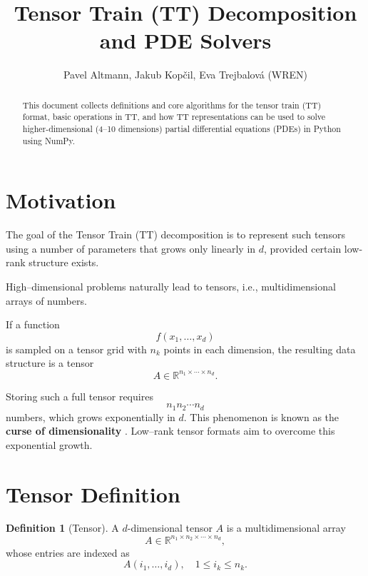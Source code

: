 \documentclass[11pt,a4paper,parskip=half-]{scrartcl}
\title{Tensor Train (TT) Decomposition and PDE Solvers}
\author{Pavel Altmann, Jakub Kopčil, Eva Trejbalová (WREN)}
\theoremstyle{definition}
\newtheorem{definition}{Definition}[section]
\theoremstyle{plain}
\theoremstyle{remark}
\begin{document}
\maketitle

\begin{abstract}
  This document collects definitions and core algorithms for the tensor train
  (TT) format, basic operations in TT, and how TT representations can be used to
  solve higher-dimensional (4--10 dimensions) partial differential equations
  (PDEs) in Python using NumPy.
\end{abstract}

\newpage
\tableofcontents
\newpage

\section{Motivation}

The goal of the Tensor Train (TT) decomposition is to represent
such tensors using a number of parameters that grows only
linearly in $d$, provided certain low-rank structure exists.

High–dimensional problems naturally lead to tensors, i.e.,
multidimensional arrays of numbers.

If a function
\[
  f(x_1,\dots,x_d)
\]
is sampled on a tensor grid with $n_k$ points in each dimension,
the resulting data structure is a tensor
\[
  A \in \mathbb{R}^{n_1 \times \cdots \times n_d}.
\]

Storing such a full tensor requires
\[
  n_1 n_2 \cdots n_d
\]
numbers, which grows exponentially in $d$. This phenomenon is known as the
\textbf{curse of dimensionality} \cite{Oseledets2009TreeTucker,Oseledets2011TT}.
Low–rank tensor formats aim to overcome this exponential growth.

\section{Tensor Definition}

\begin{definition}[Tensor]
  A $d$-dimensional tensor $A$ is a multidimensional array
  \[
    A \in \mathbb{R}^{n_1 \times n_2 \times \cdots \times n_d},
  \]
  whose entries are indexed as
  \[
    A(i_1,\dots,i_d), \quad 1 \le i_k \le n_k.
  \]
\end{definition}
\end{document}
